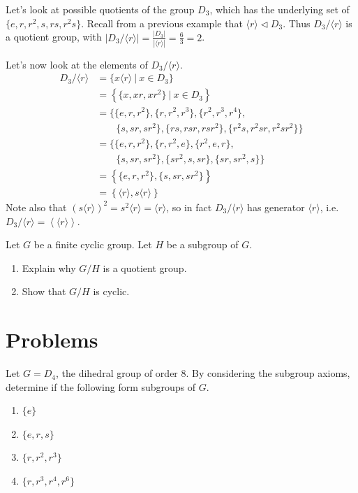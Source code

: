 \begin{example}
    Let's look at possible quotients of the group $D_3$, which has the underlying set of $\{e, r, r^2, s, rs, r^2s\}$. Recall from a previous example that $\langle r \rangle \lhd D_3$. Thus $D_3 / \langle r \rangle$ is a quotient group, with $|D_3 / \langle r \rangle| = \frac{|D_3|}{|\langle r\rangle|} = \frac63 = 2$.

    Let's now look at the elements of $D_3 / \langle r \rangle$.
    \begin{align*}
        D_3 / \langle r \rangle  &= \{x\langle r \rangle \ | \ x \in D_3\}\\
        &= \left\{\{x, xr, xr^2\} \ | \ x \in D_3\right\}\\
        &= \{\{e, r, r^2\}, \{r, r^2, r^3\}, \{r^2, r^3, r^4\}, \\ &\quad\quad \{s, sr, sr^2\}, \{rs, rsr, rsr^2\}, \{r^2s, r^2sr, r^2sr^2\}\}\\
        &= \{\{e, r, r^2\}, \{r, r^2, e\}, \{r^2, e, r\}, \\ &\quad\quad \{s, sr, sr^2\}, \{sr^2, s, sr\}, \{sr, sr^2, s\}\}\\
        &= \left\{\{e, r, r^2\}, \{s, sr, sr^2\}\right\}\\
        &= \left\{\langle r\rangle, s\langle r \rangle\right\}
    \end{align*}
    Note also that $(s\langle r \rangle)^2 = s^2\langle r \rangle = \langle r\rangle$, so in fact $D_3 / \langle r \rangle$ has generator $\langle r \rangle$, i.e. $D_3 / \langle r \rangle = \left\langle \langle r \rangle \right\rangle$.
\end{example}

\begin{exercise}\label{exercise-quotient-group-of-cyclic-group-is-cyclic}
    Let $G$ be a finite cyclic group. Let $H$ be a subgroup of $G$.
    \begin{enumerate}[label=(\roman*)]
        \item Explain why $G/H$ is a quotient group.
        \item Show that $G/H$ is cyclic.
    \end{enumerate}    
\end{exercise}

\newpage

\section{Problems}
\begin{problem}
    Let $G = D_4$, the dihedral group of order 8. By considering the subgroup axioms, determine if the following form subgroups of $G$.
    \begin{enumerate}[label=(\alph*)]
        \item $\{e\}$
        \item $\{e, r, s\}$
        \item $\{r, r^2, r^3\}$
        \item $\{r, r^3, r^4, r^6\}$
    \end{enumerate}
\end{problem}

